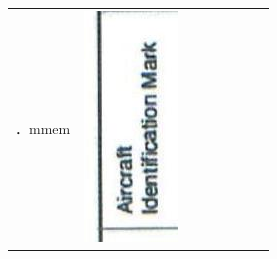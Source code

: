 \documentclass[10pt]{article}
\begin{document}
\begin{center}
\begin{tabular}{|c|c|c|c|c|c|c|c|}
\hline
．mmem & \includegraphics[max width=\textwidth]{2025_02_27_dd68c3d38de88f0516d9g-122(3)}

\end{tabular}
\end{center}
\end{document}
